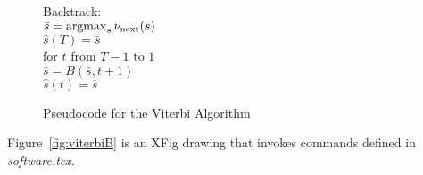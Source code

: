 \documentclass[prelim,showlabels]{book}
\newcommand{\argmax}{\operatorname*{argmax}}
\newcommand{\ti}[2]{{#1}{(#2)}}                  %
\begin{document}
\begin{figure}[htbp]
\begin{center}
{\begin{minipage}{0.90\textwidth}
\begin{tabbing}
          \< \- \< \- \< \- %
          Backtrack: \> \+ \\
          $\bar s = \argmax_s \nu\tnext(s)$ \\
          $\ti{\hat s}{T}  = \bar s$ \\
          for $t$ from $T-1$ to $1$  \\ \> \+
          $ \bar s = B(\bar s,t+1)$  \\
          $\ti{\hat s}{t} = \bar s$
        \end{tabbing}
      \end{minipage}
    }
    \caption[Pseudocode for the Viterbi Algorithm]%
    {Pseudocode for the Viterbi Algorithm}
    \label{fig:viterbi}
  \end{center}
\end{figure}
Figure~\ref{fig:viterbiB} is an XFig drawing that invokes commands
defined in \emph{software.tex}.
\end{document}

